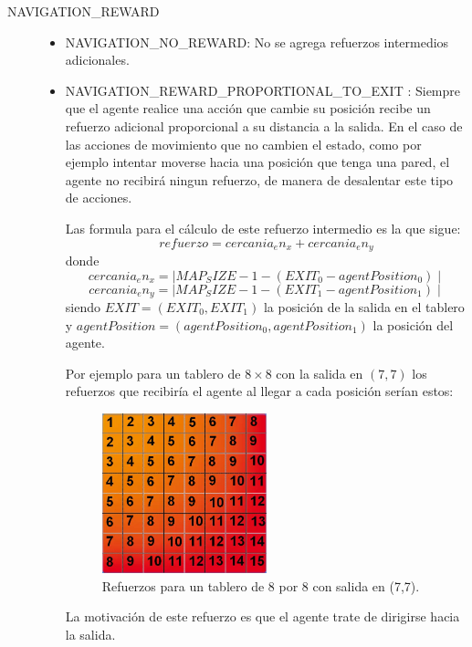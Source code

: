 \documentclass[a4paper,spanish] {article}
\begin{document}
\begin{description}
\item[NAVIGATION_REWARD] 
	\begin{itemize}
	\item NAVIGATION_NO_REWARD: No se agrega refuerzos intermedios adicionales.
	\item NAVIGATION_REWARD_PROPORTIONAL_TO_EXIT : Siempre que el agente realice una acci\'on que cambie su posici\'on recibe un refuerzo adicional proporcional a su distancia a la salida. En el caso de las acciones de movimiento que no cambien el estado, como por ejemplo intentar moverse hacia una posici\'on que tenga una pared, el agente no recibir\'a ningun refuerzo, de manera de desalentar este tipo de acciones. 
	
	Las formula para el c\'alculo de este refuerzo intermedio es la que sigue:
	$$ refuerzo = cercania_en_x + cercania_en_y $$
	donde
	$$ cercania_en_x =\mid MAP_SIZE-1 -(EXIT_0 - agentPosition_0) \mid$$
	$$ cercania_en_y =\mid MAP_SIZE-1 -(EXIT_1 - agentPosition_1) \mid$$
	siendo $EXIT = (EXIT_0, EXIT_1)$ la posici\'on de la salida en el tablero y $ agentPosition= (agentPosition_0, agentPosition_1)$ la posici\'on del agente.
	
	Por ejemplo para un tablero de $8 \times 8$ con la salida en $(7,7)$ los refuerzos que recibir\'ia el agente al llegar a cada posici\'on ser\'ian estos:
	\begin{figure}[h!]
  \centering
    \includegraphics[width=0.5\textwidth]{refuerzos.jpg}
  \caption{Refuerzos para un tablero de 8 por 8 con salida en (7,7).}
	\end{figure}	
	La motivaci\'on de este refuerzo es que el agente trate de dirigirse hacia la salida.
	\end{itemize}


\end{description}
\end{document}
